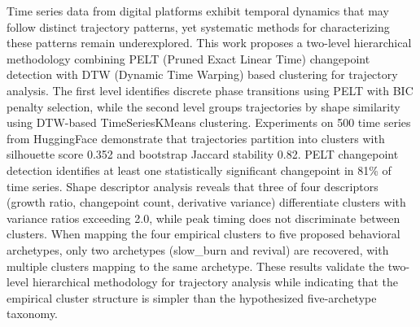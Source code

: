 
Time series data from digital platforms exhibit temporal dynamics that may follow distinct trajectory patterns, yet systematic methods for characterizing these patterns remain underexplored. This work proposes a two-level hierarchical methodology combining PELT (Pruned Exact Linear Time) changepoint detection with DTW (Dynamic Time Warping) based clustering for trajectory analysis. The first level identifies discrete phase transitions using PELT with BIC penalty selection, while the second level groups trajectories by shape similarity using DTW-based TimeSeriesKMeans clustering. Experiments on 500 time series from HuggingFace demonstrate that trajectories partition into clusters with silhouette score 0.352 and bootstrap Jaccard stability 0.82. PELT changepoint detection identifies at least one statistically significant changepoint in 81\% of time series. Shape descriptor analysis reveals that three of four descriptors (growth ratio, changepoint count, derivative variance) differentiate clusters with variance ratios exceeding 2.0, while peak timing does not discriminate between clusters. When mapping the four empirical clusters to five proposed behavioral archetypes, only two archetypes (slow\_burn and revival) are recovered, with multiple clusters mapping to the same archetype. These results validate the two-level hierarchical methodology for trajectory analysis while indicating that the empirical cluster structure is simpler than the hypothesized five-archetype taxonomy.
